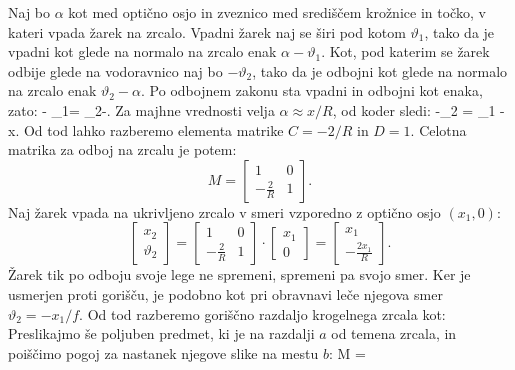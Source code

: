 Naj bo $\alpha$ kot med optično osjo in zveznico med središčem krožnice in točko, 
v kateri vpada žarek na zrcalo. Vpadni žarek naj se širi pod kotom $\vartheta_1$, tako da
je vpadni kot glede na normalo na zrcalo enak $\alpha -\vartheta_1$. Kot, pod katerim 
se žarek odbije glede na vodoravnico naj bo $-\vartheta_2$, tako da je odbojni kot glede
na normalo na zrcalo enak $\vartheta_2 - \alpha$. Po odbojnem zakonu sta vpadni in odbojni
kot enaka, zato:
\beq
\alpha - \vartheta_1= \vartheta_2-\alpha.
\label{eq:02_60}
\eeq
Za majhne vrednosti velja $\alpha \approx x/R$, od koder sledi:
\beq
-\vartheta_2 = \vartheta_1 - x.
\label{eq:02_61a}
\eeq
Od tod lahko razberemo elementa matrike $C = -2/R$ in $D = 1$. Celotna matrika za odboj 
na zrcalu je potem:
\begin{equation}
 M = \left[\begin{array}{cc}
1& 0\\
-\frac{2}{R}&1
\end{array}\right]\!\!.
 \label{eq:02_62}
\end{equation}
Naj žarek vpada na ukrivljeno zrcalo v smeri vzporedno z optično osjo $(x_1, 0)$:
\begin{equation}
\left[\begin{array}{c}
x_2\\
\vartheta_2
\end{array}\right]
= \left[\begin{array}{cc}
1& 0\\
-\frac{2}{R}&1
\end{array}\right]\cdot
\left[\begin{array}{c}
x_1\\
0
\end{array}\right] = 
\left[\begin{array}{c}
x_1\\
-\frac{2x_1}{R}
\end{array}\right]\!\!.
 \label{eq:02_63}
\end{equation}
Žarek tik po odboju svoje lege ne spremeni, spremeni pa svojo smer.
Ker je usmerjen proti gorišču, je podobno kot
pri obravnavi leče njegova smer $\vartheta_2 = -x_1/f$.
Od tod razberemo goriščno razdaljo krogelnega zrcala kot:
Preslikajmo še poljuben predmet, ki je na razdalji $a$ od temena zrcala, in poiščimo
pogoj za nastanek njegove slike na mestu $b$:
\beq
M = 
\left[\begin{array}{cc}
1& b\\
0&1
\end{array}\right]\cdot
